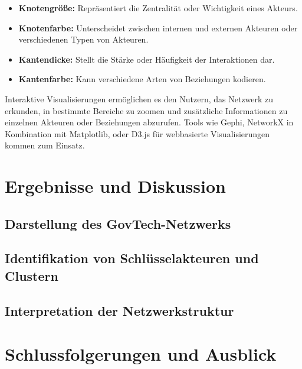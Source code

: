 \documentclass[a4paper,11pt]{article}
\begin{document}
\begin{itemize}
    \item \textbf{Knotengröße:} Repräsentiert die Zentralität oder Wichtigkeit eines Akteurs.
    \item \textbf{Knotenfarbe:} Unterscheidet zwischen internen und externen Akteuren oder verschiedenen Typen von Akteuren.
    \item \textbf{Kantendicke:} Stellt die Stärke oder Häufigkeit der Interaktionen dar.
    \item \textbf{Kantenfarbe:} Kann verschiedene Arten von Beziehungen kodieren.
\end{itemize}

Interaktive Visualisierungen ermöglichen es den Nutzern, das Netzwerk zu erkunden, in bestimmte Bereiche zu zoomen und zusätzliche Informationen zu einzelnen Akteuren oder Beziehungen abzurufen. Tools wie Gephi, NetworkX in Kombination mit Matplotlib, oder D3.js für webbasierte Visualisierungen kommen zum Einsatz.


\section{Ergebnisse und Diskussion}
\subsection{Darstellung des GovTech-Netzwerks}
\subsection{Identifikation von Schlüsselakteuren und Clustern}
\subsection{Interpretation der Netzwerkstruktur}

\section{Schlussfolgerungen und Ausblick}

%
%
\printbibliography
\end{document}
